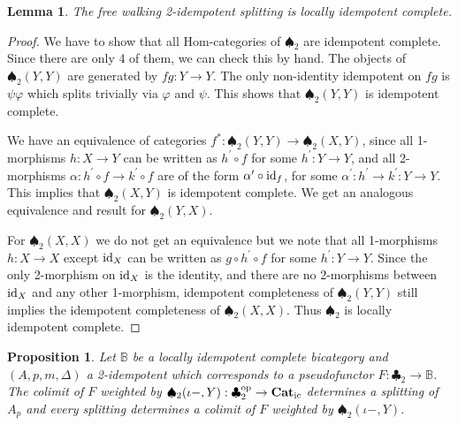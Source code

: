 \documentclass[12pt,oneside,reqno,a4paper]{article}
\newtheorem{proposition}[theorem]{Proposition}
\newtheorem{lemma}[theorem]{Lemma}
\theoremstyle{definition}
\newcommand{\op}{^\textup{op}}
\newcommand{\Catic}{\textbf{\textup{Cat}}_\textup{ic}}
\newcommand{\clb}{\clubsuit}
\newcommand{\spd}{\spadesuit}
\renewcommand{\phi}{\varphi}
\newcommand{\id}{\textup{id}}
\newcommand{\bB}{\mathbb{B}}
\newcommand{\p}{^\prime}
\begin{document}
\begin{lemma} \label{spd2idcomp}
The free walking 2-idempotent splitting is locally idempotent complete.
\end{lemma}

\begin{proof}
We have to show that all Hom-categories of $\spd_2$ are idempotent complete. Since there are only 4 of them, we can check this by hand. The objects of $\spd_2(Y,Y)$ are generated by $fg:Y\to Y$. The only non-identity idempotent on $fg$ is $\psi\phi$ which splits trivially via $\phi$ and $\psi$. This shows that $\spd_2(Y,Y)$ is idempotent complete.

We have an equivalence of categories $f^*:\spd_2(Y,Y)\to\spd_2(X,Y)$, since all 1-morphisms $h:X\to Y$ can be written as $h\p \circ f$ for some $h\p:Y\to Y$, and all 2-morphisms $\alpha:h\p \circ f\to k\p \circ f$ are of the form $\alpha\p \circ \id_f$, for some $\alpha\p:h\p \to k\p:Y\to Y$. This implies that $\spd_2(X,Y)$ is idempotent complete. We get an analogous equivalence and result for $\spd_2(Y,X)$.

For $\spd_2(X,X)$ we do not get an equivalence but we note that all 1-morphisms $h:X\to X$ except $\id_X$ can be written as $g\circ h\p\circ f$ for some $h\p:Y\to Y$. Since the only 2-morphism on $\id_X$ is the identity, and there are no 2-morphisms between $\id_X$ and any other 1-morphism, idempotent completeness of $\spd_2(Y,Y)$ still implies the idempotent completeness of $\spd_2(X,X)$. Thus $\spd_2$ is locally idempotent complete.
\end{proof}

\begin{proposition}
Let $\bB$ be a locally idempotent complete bicategory and $(A,p,m,\Delta)$ a 2-idempotent which corresponds to a pseudofunctor $F:\clb_2\to\bB$. The colimit of $F$ weighted by $\spd_2(\iota-,Y):\clb_2\op\to\Catic$ determines a splitting of $A_p$ and every splitting determines a colimit of $F$ weighted by $\spd_2(\iota-,Y)$.
\end{proposition}
\end{document}
